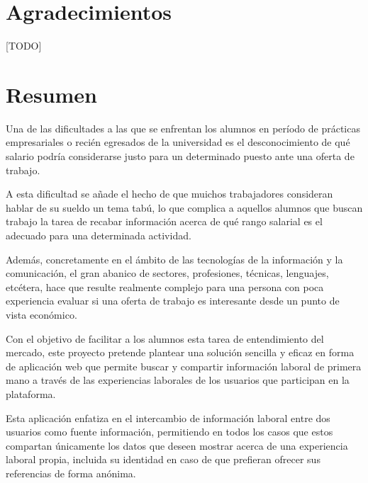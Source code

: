 \documentclass[a4paper, 12pt]{book}
\begin{document}

    \chapter*{Agradecimientos}

    [TODO]


    \chapter*{Resumen}

    Una de las dificultades a las que se enfrentan los alumnos en período de prácticas empresariales o recién egresados de la universidad
    es el desconocimiento de qué salario podría considerarse justo para un determinado puesto ante una oferta de trabajo.

    A esta dificultad se añade el hecho de que muichos trabajadores consideran hablar de su sueldo un tema tabú,
    lo que complica a aquellos alumnos que buscan trabajo la tarea de recabar información acerca de qué rango salarial es el adecuado para una determinada actividad.

    Además, concretamente en el ámbito de las tecnologías de la información y la comunicación, el gran abanico de sectores, profesiones, técnicas, lenguajes, etcétera,
    hace que resulte realmente complejo para una persona con poca experiencia evaluar si una oferta de trabajo es interesante desde un punto de vista económico.

    Con el objetivo de facilitar a los alumnos esta tarea de entendimiento del mercado, este proyecto pretende plantear una solución sencilla y eficaz en forma de aplicación
    web que permite buscar y compartir información laboral de primera mano a través de las experiencias laborales de los usuarios que participan en la plataforma.

    Esta aplicación enfatiza en el intercambio de información laboral entre dos usuarios como fuente información, permitiendo en todos los casos que estos compartan únicamente los datos que deseen mostrar acerca de una experiencia laboral propia,
    incluida su identidad en caso de que prefieran ofrecer sus referencias de forma anónima.
\end{document}
